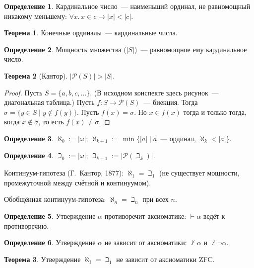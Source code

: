 \documentclass[a4paper,11pt]{article}
\theoremstyle{definition}
\newtheorem*{thm}{Теорема}
\newtheorem*{dfn}{Определение}
\newcommand{\proves}{\vdash}
\begin{document}
\begin{dfn}
Кардинальное число~--- наименьший ординал, не равномощный никакому меньшему:
$\forall x.\,x \in c \to |x| < |c|$.
\end{dfn}
\begin{thm}
Конечные ординалы~--- кардинальные числа.
\end{thm}
\begin{dfn}
Мощность множества ($|S|$)~--- равномощное ему кардинальное число.
\end{dfn}
\begin{thm}[Кантор]
$|\mathcal{P}(S)| > |S|$.
\end{thm}
\begin{proof}
Пусть $S = \{a, b, c, \dots\}$. (В исходном конспекте здесь рисунок~---
диагональная таблица.) Пусть $f : S \to \mathcal{P}(S)$~--- биекция. Тогда
$\sigma = \{y \in S \mid y \notin f(y)\}$. Пусть $f(x) = \sigma$. Но $x \in f(x)$
тогда и только тогда, когда $x \notin \sigma$, то есть $f(x) \ne \sigma$.
\end{proof}
\begin{dfn}
$\aleph_0 := |\omega|$; $\aleph_{k+1} := \min\{|a| \mid a$~--- ординал, $\aleph_k
< |a|\}$.
\end{dfn}
\begin{dfn}
$\beth_0 := |\omega|$; $\beth_{k+1} := |\mathcal{P}(\beth_k)|$.
\end{dfn}
Континуум-гипотеза (Г.~Кантор, 1877): $\aleph_1 = \beth_1$ (не существует
мощности, промежуточной между счётной и континуумом).

Обобщённая континуум-гипотеза: $\aleph_n = \beth_n$ при всех $n$.
\begin{dfn}
Утверждение $\alpha$ противоречит аксиоматике: $\proves \alpha$ ведёт к
противоречию.
\end{dfn}
\begin{dfn}
Утверждение $\alpha$ не зависит от аксиоматики: $\nvdash \alpha$ и $\nvdash
\neg\alpha$.
\end{dfn}
\begin{thm}
Утверждение $\aleph_1 = \beth_1$ не зависит от аксиоматики ZFC.
\end{thm}
\end{document}
